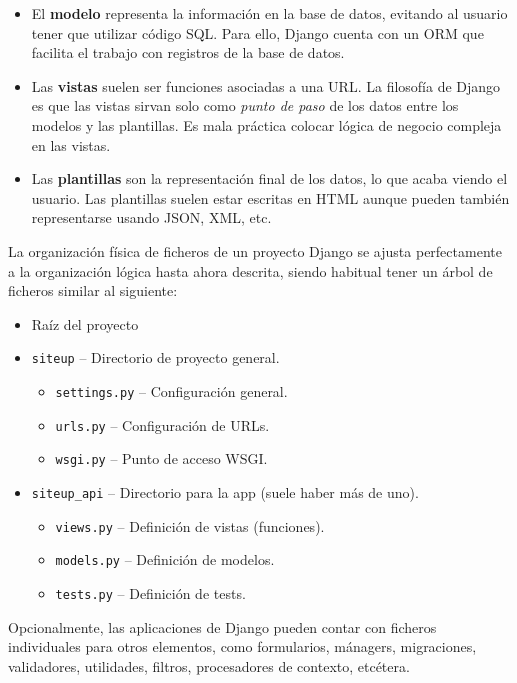 \begin{itemize}
\item El \textbf{modelo} representa la información en la base de datos, evitando
  al usuario tener que utilizar código SQL. Para ello, Django cuenta con un
  \ac{ORM} que facilita el trabajo con registros de la base de datos.
\item Las \textbf{vistas} suelen ser funciones asociadas a una URL. La filosofía
  de Django es que las vistas sirvan solo como \textit{punto de paso} de los
  datos entre los modelos y las plantillas. Es mala práctica colocar lógica de
  negocio compleja en las vistas.
\item Las \textbf{plantillas} son la representación final de los datos, lo que
  acaba viendo el usuario. Las plantillas suelen estar escritas en HTML aunque
  pueden también representarse usando JSON, XML, etc.
\end{itemize}

La organización física de ficheros de un proyecto Django se ajusta perfectamente
a la organización lógica hasta ahora descrita, siendo habitual tener un árbol de
ficheros similar al siguiente:

\begin{itemize}
\item Raíz del proyecto
\item \texttt{siteup} --  Directorio de proyecto general.
  \begin{itemize}
  \item \texttt{settings.py} -- Configuración general.
  \item \texttt{urls.py} -- Configuración de URLs.
  \item \texttt{wsgi.py} -- Punto de acceso WSGI.
  \end{itemize}
\item \texttt{siteup\_api} --  Directorio para la app (suele haber más de uno).
  \begin{itemize}
  \item \texttt{views.py} -- Definición de vistas (funciones).
  \item \texttt{models.py} -- Definición de modelos.
  \item \texttt{tests.py} -- Definición de tests.
  \end{itemize}
\end{itemize}

Opcionalmente, las aplicaciones de Django pueden contar con ficheros
individuales para otros elementos, como formularios, mánagers, migraciones,
validadores, utilidades, filtros, procesadores de contexto, etcétera.

